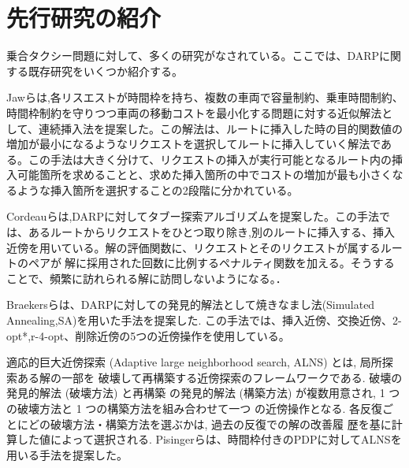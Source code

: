 \chapter{先行研究の紹介}\label{previous_research}
乗合タクシー問題に対して、多くの研究がなされている。ここでは、DARPに関する既存研究をいくつか紹介する。

Jawらは,各リスエストが時間枠を持ち、複数の車両で容量制約、乗車時間制約、時間枠制約を守りつつ車両の移動コストを最小化する問題に対する近似解法として、連続挿入法を提案した\cite{insertion}。この解法は、ルートに挿入した時の目的関数値の増加が最小になるようなリクエストを選択してルートに挿入していく解法である。この手法は大きく分けて、リクエストの挿入が実行可能となるルート内の挿入可能箇所を求めることと、求めた挿入箇所の中でコストの増加が最も小さくなるような挿入箇所を選択することの2段階に分かれている。

Cordeauらは,DARPに対してタブー探索アルゴリズムを提案した。この手法では、あるルートからリクエストをひとつ取り除き,別のルートに挿入する、挿入近傍を用いている。解の評価関数に、リクエストとそのリクエストが属するルートのペアが解に採用された回数に比例するペナルティ関数を加える。そうすることで、頻繁に訪れられる解に訪問しないようになる。\cite{tabu}．

Braekersらは、DARPに対しての発見的解法として焼きなまし法(Simulated Annealing,SA)を用いた手法を提案した\cite{SA}. この手法では、挿入近傍、交換近傍、2-opt*,r-4-opt、削除近傍の5つの近傍操作を使用している。

適応的巨大近傍探索 (Adaptive large neighborhood search, ALNS) とは, 局所探索ある解の一部を 破壊して再構築する近傍探索のフレームワークである\cite{ALNS}. 破壊の発見的解法 (破壊方法) と再構築 の発見的解法 (構築方法) が複数用意され, 1 つの破壊方法と 1 つの構築方法を組み合わせて一つ の近傍操作となる. 各反復ごとにどの破壊方法・構築方法を選ぶかは, 過去の反復での解の改善履 歴を基に計算した値によって選択される.
Pisingerらは、時間枠付きのPDPに対してALNSを用いる手法を提案した\cite{pisinger}。
